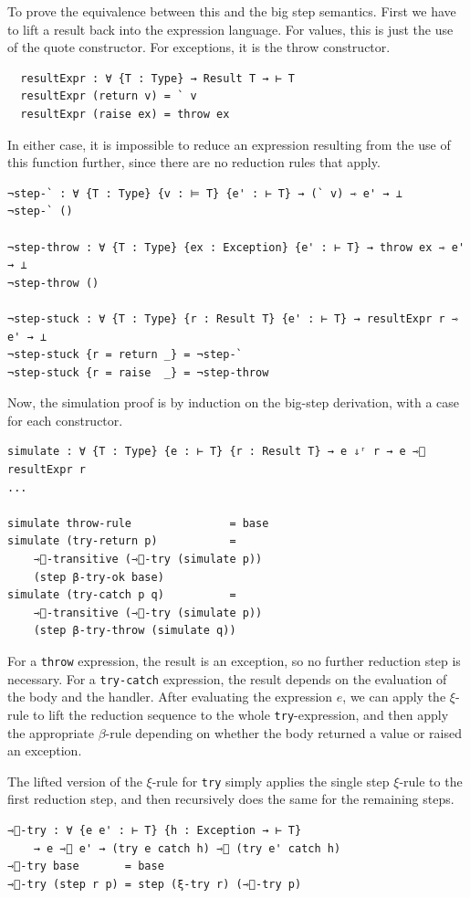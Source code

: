 To prove the equivalence between this and the big step semantics. First we have to lift a result back into the expression language. For values, this is just the use of the quote constructor. For exceptions, it is the throw constructor.
\begin{verbatim}
  resultExpr : ∀ {T : Type} → Result T → ⊢ T
  resultExpr (return v) = ` v
  resultExpr (raise ex) = throw ex
\end{verbatim}

In either case, it is impossible to reduce an expression resulting from the use of this function further, since there are no reduction rules that apply.
\begin{verbatim}
¬step-` : ∀ {T : Type} {v : ⊨ T} {e' : ⊢ T} → (` v) ⇾ e' → ⊥
¬step-` ()

¬step-throw : ∀ {T : Type} {ex : Exception} {e' : ⊢ T} → throw ex ⇾ e' → ⊥
¬step-throw ()

¬step-stuck : ∀ {T : Type} {r : Result T} {e' : ⊢ T} → resultExpr r ⇾ e' → ⊥
¬step-stuck {r = return _} = ¬step-`
¬step-stuck {r = raise  _} = ¬step-throw
\end{verbatim}

Now, the simulation proof is by induction on the big-step derivation, with a case for each constructor.
\begin{verbatim}
simulate : ∀ {T : Type} {e : ⊢ T} {r : Result T} → e ⇓ʳ r → e ⇾⃰ resultExpr r
...

simulate throw-rule               = base
simulate (try-return p)           =
    ⇾⃰-transitive (⇾⃰-try (simulate p))
    (step β-try-ok base)
simulate (try-catch p q)          =
    ⇾⃰-transitive (⇾⃰-try (simulate p))
    (step β-try-throw (simulate q))
\end{verbatim}

For a \texttt{throw} expression, the result is an exception, so no further reduction step is necessary. 
For a \texttt{try-catch} expression, the result depends on the evaluation of the body and the handler. After evaluating the expression $e$, we can apply the $\xi$-rule to lift the reduction sequence to the whole \texttt{try}-expression, and then apply the appropriate $\beta$-rule depending on whether the body returned a value or raised an exception.

The lifted version of the $\xi$-rule for \texttt{try} simply applies the single step $\xi$-rule to the first reduction step, and then recursively does the same for the remaining steps.
\begin{verbatim}
⇾⃰-try : ∀ {e e' : ⊢ T} {h : Exception → ⊢ T}
    → e ⇾⃰ e' → (try e catch h) ⇾⃰ (try e' catch h)
⇾⃰-try base       = base
⇾⃰-try (step r p) = step (ξ-try r) (⇾⃰-try p)
\end{verbatim}

